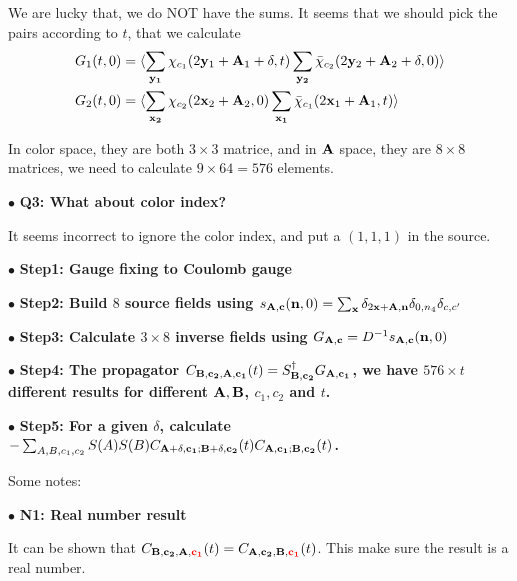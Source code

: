 We are lucky that, we do NOT have the sums. It seems that we should pick the pairs according to $t$, that we calculate
\begin{equation}
\begin{split}
&G_1(t,0)=\langle \sum _{\bf y _1}\chi _{c_1} (2{\bf y}_1+{\bf A}_1+\delta,t)  \sum _{\bf y_2}\bar{\chi} _{c_2} (2{\bf y}_2+{\bf A}_2+\delta,0) \rangle\\
&G_2(t,0)=\langle \sum _{\bf x _2} \chi_{c_2}(2{\bf x}_2+{\bf A}_2,0) \sum _{\bf x _1}\bar{\chi}_{c_1}(2{\bf x}_1+{\bf A}_1,t) \rangle\\
\end{split}
\end{equation}

In color space, they are both $3\times 3$ matrice, and in ${\bf A}$ space, they are $8\times 8$ matrices, we need to calculate $9\times 64=576$ elements.

$\bullet$ \textbf{Q3: What about color index?}

It seems incorrect to ignore the color index, and put a $(1,1,1)$ in the source.

$\bullet$ \textbf{Step1: Gauge fixing to Coulomb gauge}

$\bullet$ \textbf{Step2: Build $8$ source fields using $s_{\bf A, c}({\bf n}, 0) = \sum _{{\bf x}} \delta _{2{\bf x}+{\bf A},{\bf n}}\delta _{0,n_4}\delta_{c,c'}$}

$\bullet$ \textbf{Step3: Calculate $3\times 8$ inverse fields using $G _{\bf A, c}=D^{-1}s_{\bf A, c}({\bf n}, 0)$}

$\bullet$ \textbf{Step4: The propagator $C_{\bf B,c_2,\bf A,c_1}(t)=S _{\bf B,c_2}^{\dagger}G_{\bf A, c_1}$, we have $576 \times t$ different results for different ${\bf A,B}$, ${c_1,c_2}$ and $t$.}

$\bullet$ \textbf{Step5: For a given $\delta$, calculate $-\sum _{A,B,c_1,c_2}S(A)S(B)C_{\bf A+\delta,c_1;\bf B +\delta,c_2}(t)C_{\bf A,c_1;\bf B,c_2}(t)$.}

Some notes:

$\bullet$ \textbf{N1: Real number result}

It can be shown that $C_{\bf B,c_2,\bf A,\textcolor[rgb]{1,0,0}{c_1}}(t)=C_{\bf A,c_2,\bf B,\textcolor[rgb]{1,0,0}{c_1}}(t)$. This make sure the result is a real number.




